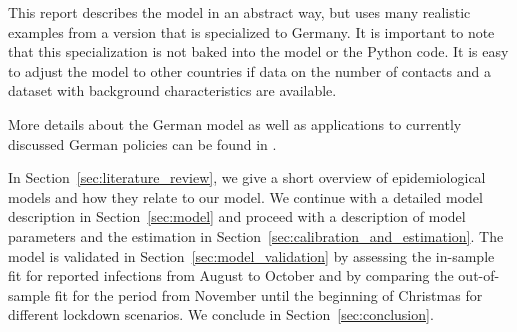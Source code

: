 
This report describes the model in an abstract way, but uses many realistic examples
from a version that is specialized to Germany. It is important to note that this
specialization is not baked into the model or the Python code. It is easy to adjust the
model to other countries if data on the number of contacts and a dataset with background
characteristics are available.

More details about the German model as well as applications to currently discussed
German policies can be found in \citet{Dorn2020a}.

In Section~\ref{sec:literature_review}, we give a short overview of epidemiological
models and how they relate to our model. We continue with a detailed model description
in Section~\ref{sec:model} and proceed with a description of model parameters and the
estimation in Section~\ref{sec:calibration_and_estimation}. The model is validated in
Section~\ref{sec:model_validation} by assessing the in-sample fit for reported
infections from August to October and by comparing the out-of-sample fit for the period
from November until the beginning of Christmas for different lockdown scenarios. We
conclude in Section~\ref{sec:conclusion}.

